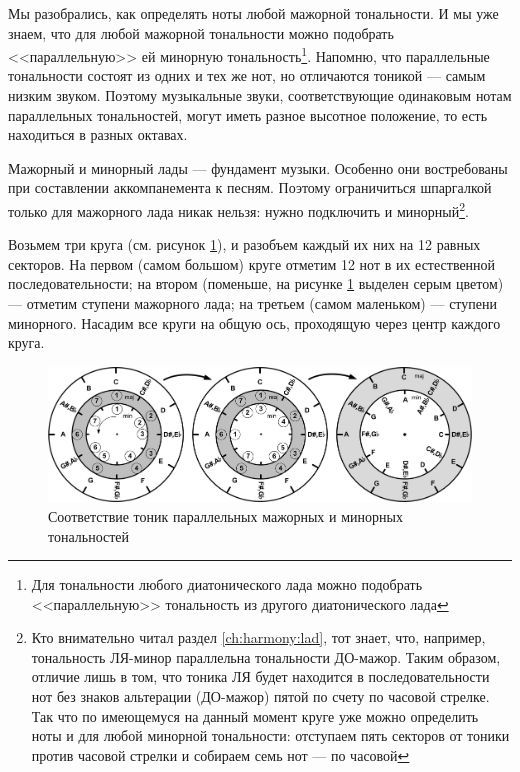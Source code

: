 Мы разобрались, как определять ноты любой мажорной тональности. И мы уже знаем, что для любой мажорной тональности можно подобрать <<параллельную>> ей минорную тональность\footnote{Для тональности любого диатонического лада можно подобрать <<параллельную>> тональность из другого диатонического лада}. Напомню, что параллельные тональности состоят из одних и тех же нот, но отличаются тоникой --- самым низким звуком. Поэтому музыкальные звуки, соответствующие одинаковым нотам параллельных тональностей, могут иметь разное высотное положение, то есть находиться в разных октавах.

Мажорный и минорный лады --- фундамент музыки. Особенно они востребованы при составлении аккомпанемента к песням. Поэтому ограничиться шпаргалкой только для мажорного лада никак нельзя: нужно подключить и минорный\footnote{Кто внимательно читал раздел \ref{ch:harmony:lad}, тот знает, что, например, тональность ЛЯ-минор параллельна тональности ДО-мажор. Таким образом, отличие лишь в том, что тоника ЛЯ будет находится в последовательности нот без знаков альтерации (ДО-мажор) пятой по счету по часовой стрелке. Так что по имеющемуся на данный момент круге уже можно определить ноты и для любой минорной тональности: отступаем пять секторов от тоники против часовой стрелки и собираем семь нот --- по часовой}.

Возьмем три круга (см. рисунок \ref{fig:harmony:kvinto-kvarto:minor-major-mapping}), и разобъем каждый их них на 12 равных секторов. На первом (самом большом) круге отметим 12 нот в их естественной последовательности; на втором (поменьше, на рисунке \ref{fig:harmony:kvinto-kvarto:minor-major-mapping} выделен серым цветом) --- отметим ступени мажорного лада; на третьем (самом маленьком) --- ступени минорного. Насадим все круги на общую ось, проходящую через центр каждого круга.

\begin{figure}[!ht]
    \centering
    \includegraphics[scale=0.5]{fig/kvinto-kvarto/minor-major-mapping} 
    \caption{Соответствие тоник параллельных мажорных и минорных тональностей}\label{fig:harmony:kvinto-kvarto:minor-major-mapping}
\end{figure}

